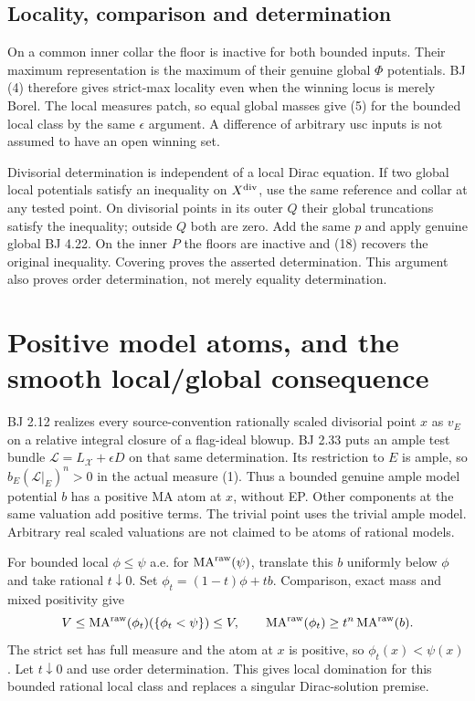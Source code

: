 \documentclass[
  11pt,
]{article}
\begin{document}
\subsection{Locality, comparison and
determination}\label{locality-comparison-and-determination}

On a common inner collar the floor is inactive for both bounded inputs.
Their maximum representation is the maximum of their genuine global
\(\Phi\) potentials. BJ (4) therefore gives strict-max locality even
when the winning locus is merely Borel. The local measures patch, so
equal global masses give (5) for the bounded local class by the same
\(\epsilon\) argument. A difference of arbitrary usc inputs is not
assumed to have an open winning set.

Divisorial determination is independent of a local Dirac equation. If
two global local potentials satisfy an inequality on \(X^{\rm div}\),
use the same reference and collar at any tested point. On divisorial
points in its outer \(Q\) their global truncations satisfy the
inequality; outside \(Q\) both are zero. Add the same \(p\) and apply
genuine global BJ 4.22. On the inner \(P\) the floors are inactive and
(18) recovers the original inequality. Covering proves the asserted
determination. This argument also proves order determination, not merely
equality determination.

\section{Positive model atoms, and the smooth local/global
consequence}\label{positive-model-atoms-and-the-smooth-localglobal-consequence}

BJ 2.12 realizes every source-convention rationally scaled divisorial
point \(x\) as \(v_E\) on a relative integral closure of a flag-ideal
blowup. BJ 2.33 puts an ample test bundle
\(\mathcal L=L_{\mathcal X}+\epsilon D\) on that same determination. Its
restriction to \(E\) is ample, so \(b_E(\mathcal L|_E)^n>0\) in the
actual measure (1). Thus a bounded genuine ample model potential \(b\)
has a positive MA atom at \(x\), without EP. Other components at the
same valuation add positive terms. The trivial point uses the trivial
ample model. Arbitrary real scaled valuations are not claimed to be
atoms of rational models.

For bounded local \(\phi\le\psi\) a.e. for
\(\operatorname{MA}^{\rm raw}(\psi)\), translate this \(b\) uniformly
below \(\phi\) and take rational \(t\downarrow0\). Set
\(\phi_t=(1-t)\phi+tb\). Comparison, exact mass and mixed positivity
give \[
 V\le\operatorname{MA}^{\rm raw}(\phi_t)(\{\phi_t<\psi\})\le V,
 \qquad\operatorname{MA}^{\rm raw}(\phi_t)\ge t^n
                                      \operatorname{MA}^{\rm raw}(b).
\] The strict set has full measure and the atom at \(x\) is positive, so
\(\phi_t(x)<\psi(x)\). Let \(t\downarrow0\) and use order determination.
This gives local domination for this bounded rational local class and
replaces a singular Dirac-solution premise.
\end{document}
